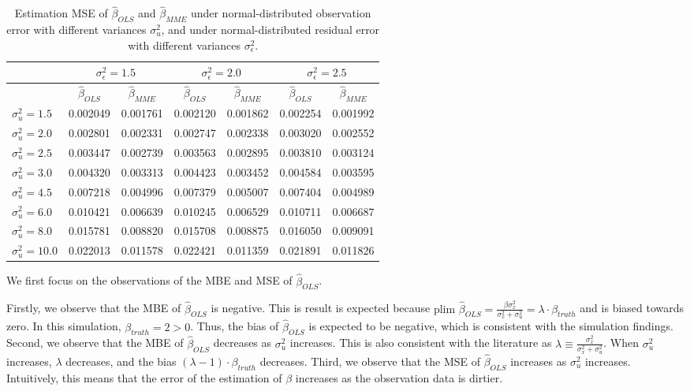 \documentclass{article}
\begin{document}
\begin{table}[ht]
    \centering
    \caption{Estimation MSE of $\hat{\beta}_{OLS}$ and $\hat{\beta}_{MME}$ under normal-distributed observation error with different variances $\sigma^2_u$, and under normal-distributed residual error with different variances $\sigma^2_\epsilon$.}
    \label{Tab:MSE_normal}
    \begin{tabular}[t]{lcccccc}
        \hline
        &\multicolumn{2}{c}{$\sigma^2_\epsilon=1.5$}&\multicolumn{2}{c}{$\sigma^2_\epsilon=2.0$}&\multicolumn{2}{c}{$\sigma^2_\epsilon=2.5$}\\
        \hline
        &$\hat{\beta}_{OLS}$&$\hat{\beta}_{MME}$&$\hat{\beta}_{OLS}$&$\hat{\beta}_{MME}$&$\hat{\beta}_{OLS}$&$\hat{\beta}_{MME}$\\
        \hline
        $\sigma^2_u = 1.5$&0.002049&0.001761&0.002120&0.001862&0.002254&0.001992\\
        $\sigma^2_u = 2.0$&0.002801&0.002331&0.002747&0.002338&0.003020&0.002552\\
        $\sigma^2_u = 2.5$&0.003447&0.002739&0.003563&0.002895&0.003810&0.003124\\
        $\sigma^2_u = 3.0$&0.004320&0.003313&0.004423&0.003452&0.004584&0.003595\\
        $\sigma^2_u = 4.5$&0.007218&0.004996&0.007379&0.005007&0.007404&0.004989\\
        $\sigma^2_u = 6.0$&0.010421&0.006639&0.010245&0.006529&0.010711&0.006687\\
        $\sigma^2_u = 8.0$&0.015781&0.008820&0.015708&0.008875&0.016050&0.009091\\
        $\sigma^2_u = 10.0$&0.022013&0.011578&0.022421&0.011359&0.021891&0.011826\\
    \end{tabular}
\end{table}

We first focus on the observations of the MBE and MSE of $\hat{\beta}_{OLS}$.

Firstly, we observe that the MBE of $\hat{\beta}_{OLS}$ is negative.
This is result is expected because $\textrm{plim } \hat{\beta}_{OLS} = \frac{\beta \sigma^2_x}{\sigma^2_x + \sigma^2_u} = \lambda \cdot \beta_{truth}$ and is biased towards zero.
In this simulation, $\beta_{truth} = 2 > 0$.
Thus, the bias of $\hat{\beta}_{OLS}$ is expected to be negative, which is consistent with the simulation findings.
Second, we observe that the MBE of $\hat{\beta}_{OLS}$ decreases as $\sigma^2_u$ increases.
This is also consistent with the literature as $\lambda \equiv \frac{\sigma_x^2}{\sigma_x^2 + \sigma_u^2}$.
When $\sigma^2_u$ increases, $\lambda$ decreases, and the bias $(\lambda-1) \cdot \beta_{truth}$ decreases.
Third, we observe that the MSE of $\hat{\beta}_{OLS}$ increases as $\sigma^2_u$ increases. Intuitively, this means that the error of the estimation of $\beta$ increases as the observation data is dirtier. 
\end{document}
